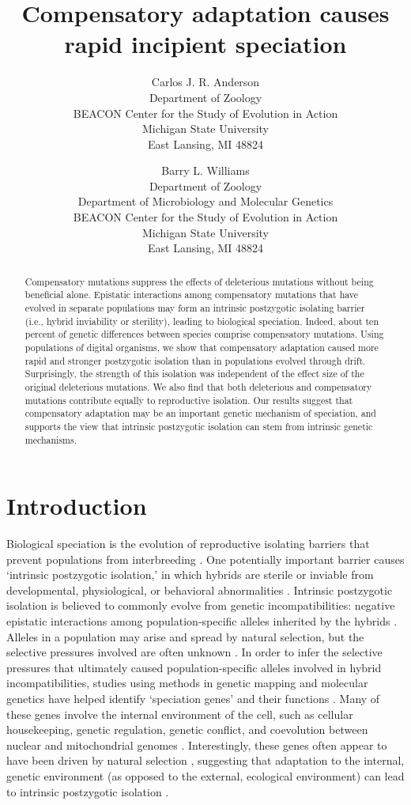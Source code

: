 \documentclass[11pt]{article}
\title{Compensatory adaptation causes\\rapid incipient speciation}
\author{Carlos J. R. Anderson\\
        Department of Zoology\\
        BEACON Center for the Study of Evolution in Action\\
        Michigan State University\\
        East Lansing, MI 48824
        \and
        Barry L. Williams\\
        Department of Zoology\\
        Department of Microbiology and Molecular Genetics\\
        BEACON Center for the Study of Evolution in Action\\
        Michigan State University\\
        East Lansing, MI 48824}
\begin{document}
\maketitle

\begin{abstract}
Compensatory mutations suppress the effects of deleterious mutations
without being beneficial alone.
%
Epistatic interactions among compensatory mutations that have
evolved in separate populations may form an intrinsic
postzygotic isolating barrier (i.e., hybrid inviability or sterility),
leading to biological speciation.
%
Indeed, about ten percent of genetic differences between species
comprise compensatory mutations.
%
Using populations of digital organisms, we show that
compensatory adaptation caused more rapid and stronger
postzygotic isolation than in
populations evolved through drift.
%
Surprisingly, the strength of this isolation was independent
of the effect size of the original deleterious mutations.
%
We also find that
both deleterious and compensatory mutations
contribute equally to reproductive isolation.
%
Our results suggest that compensatory adaptation may be
an important genetic mechanism of speciation,
and supports the view that intrinsic postzygotic isolation
can stem from intrinsic genetic mechanisms.
\end{abstract}



\section*{Introduction}

Biological speciation is the evolution of reproductive isolating
barriers that prevent populations from interbreeding \cite{coy04}.
%
One potentially important barrier causes `intrinsic postzygotic isolation,'
in which hybrids are sterile or inviable from developmental, physiological,
or behavioral abnormalities \cite{coy04}.
%
Intrinsic postzygotic isolation is believed to commonly evolve
from genetic incompatibilities: negative epistatic interactions
among population-specific alleles inherited by the hybrids \cite{pre10}.
%
Alleles in a population may arise and spread by natural selection,
but the selective pressures involved are often unknown \cite{sch09}.
%
In order to infer the selective pressures that ultimately caused
population-specific alleles involved in hybrid incompatibilities,
studies using methods in genetic mapping and molecular genetics
have helped identify `speciation genes' and their functions
\cite{noo06,mah11}.
%
Many of these genes involve the internal environment of the cell,
such as cellular housekeeping, genetic regulation, genetic conflict,
and coevolution between nuclear and mitochondrial genomes \cite{noo06,wol10}.
%
Interestingly, these genes often appear to have been driven
by natural selection \cite{noo06}, suggesting that adaptation to the internal,
genetic environment (as opposed to the external, ecological environment)
can lead to intrinsic postzygotic isolation \cite{pha09,pre10}.
\end{document}
